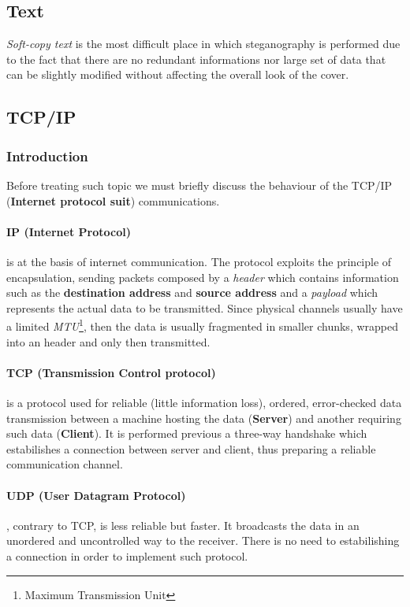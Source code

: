 \documentclass[../../main.tex]{subfiles}
\begin{document}
    \subsection{Text}
    \emph{Soft-copy text} is the most difficult place in which steganography is
    performed due to the fact that there are no redundant informations nor large
    set of data that can be slightly modified without affecting the overall look
    of the cover.

    \subsection{TCP/IP}
    \subsubsection{Introduction}
    Before treating such topic we must briefly discuss the behaviour of the
    TCP/IP (\textbf{Internet protocol suit}) communications.
    
    \paragraph{IP (Internet Protocol)} is at the basis of internet
    communication. The protocol exploits the principle of encapsulation, sending
    packets composed by a \emph{header} which contains information such as the
    \textbf{destination address} and \textbf{source address} and a
    \emph{payload} which represents the actual data to be transmitted.
    Since physical channels usually have a limited \emph{MTU}\footnote{Maximum
    Transmission Unit}, then the data is usually fragmented in smaller chunks,
    wrapped into an header and only then transmitted.
    
    \paragraph{TCP (Transmission Control protocol)} is a protocol used for
    reliable (little information loss), ordered, error-checked data transmission
    between a machine hosting the data (\textbf{Server}) and another requiring
    such data (\textbf{Client}). It is performed previous a three-way handshake
    which estabilishes a connection between server and client, thus preparing a
    reliable communication channel.

    \paragraph{UDP (User Datagram Protocol)}, contrary to TCP, is less reliable
    but faster.
    It broadcasts the data in an unordered and uncontrolled way to the receiver. 
    There is no need to estabilishing a connection in order to implement such
    protocol.
\end{document}
